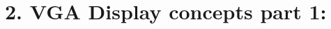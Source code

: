\documentclass{article}
\begin{document}
\section{2. VGA Display concepts part 1:}
% 
% 
% 
\end{document}
